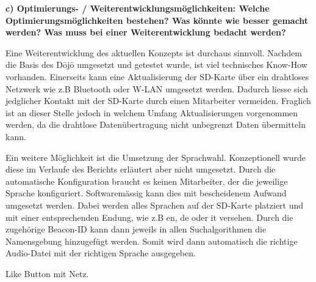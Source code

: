 \textbf{c) Optimierungs- / Weiterentwicklungsmöglichkeiten: Welche Optimierungsmöglichkeiten bestehen? Was könnte wie besser gemacht werden? Was muss bei einer Weiterentwicklung bedacht werden?
}
 
Eine Weiterentwicklung des aktuellen Konzepts ist durchaus sinnvoll. Nachdem die Basis des Dōjō umgesetzt und getestet wurde, ist viel technisches \glqq Know-How \grqq vorhanden. Einerseits kann eine Aktualisierung der SD-Karte über ein drahtloses Netzwerk wie z.B Bluetooth oder W-LAN umgesetzt werden. Dadurch liesse sich jedglicher Kontakt mit der SD-Karte durch einen Mitarbeiter vermeiden. Fraglich ist an dieser Stelle jedoch in welchem Umfang Aktualisierungen vorgenommen werden, da die drahtlose Datenübertragung nicht unbegrenzt Daten übermitteln kann.
 
Ein weitere Möglichkeit ist die Umsetzung der Sprachwahl. Konzeptionell wurde diese im Verlaufe des Berichts erläutert aber nicht umgesetzt. Durch die automatische Konfiguration braucht es keinen Mitarbeiter, der die jeweilige Sprache konfiguriert. Softwaremässig kann dies mit bescheidenem Aufwand umgesetzt werden. Dabei werden alles Sprachen auf der SD-Karte platziert und mit einer entsprechenden Endung, wie z.B en, de oder it versehen. Durch die zugehörige Beacon-ID kann dann jeweils in allen Suchalgorithmen die Namensgebung hinzugefügt werden. Somit wird dann automatisch die richtige Audio-Datei mit der richtigen Sprache ausgegeben.
 
Like Button mit Netz.